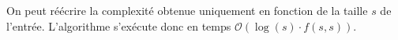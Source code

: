 \begin{exercice}
\begin{corrections}
    On peut réécrire la complexité obtenue uniquement en fonction de la taille $s$ de l'entrée.
    L'algorithme \Diam s'exécute donc en temps
    $\mathcal{O}\left(\log(s) \cdot f(s, s)\right)$.
  \end{corrections}
  
\end{exercice}

\endgroup
\endinput
